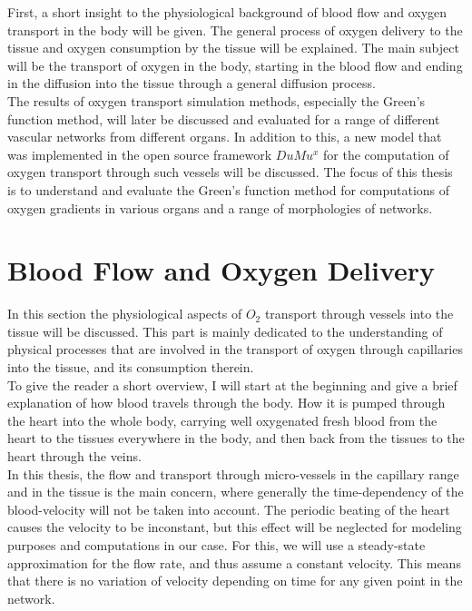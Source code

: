 First, a short insight to the physiological background of blood flow and oxygen transport in the body will be given. The general process of oxygen delivery to the tissue and oxygen consumption by the tissue will be explained. The main subject will be the transport of oxygen in the body, starting in the blood flow and ending in the diffusion into the tissue through a general diffusion process.
\\The results of oxygen transport simulation methods, especially the Green’s function method, will later be discussed and evaluated for a range of different vascular networks from different organs. In addition to this, a new model that was implemented in the open source framework $DuMu^x$ for the computation of oxygen transport through such vessels will be discussed. The focus of this thesis is to understand and evaluate the Green’s function method for computations of oxygen gradients in various organs and a range of morphologies of networks.

\newpage
\section{Blood Flow and Oxygen Delivery}

In this section the physiological aspects of $O_2$ transport through vessels into the tissue will be discussed. This part is mainly dedicated to the understanding of physical processes that are involved in the transport of oxygen through capillaries into the tissue, and its consumption therein. %
\\To give the reader a short overview, I will start at the beginning and give a brief explanation of how blood travels through the body. How it is pumped through the heart into the whole body, carrying well oxygenated fresh blood from the heart to the tissues everywhere in the body, and then back from the tissues to the heart through the veins.
\\In this thesis, the flow and transport through micro-vessels in the capillary range and in the tissue is the main concern, where generally the time-dependency of the blood-velocity will not be taken into account. The periodic beating of the heart causes the velocity to be inconstant, but this effect will be neglected for modeling purposes and computations in our case. For this, we will use a steady-state approximation for the flow rate, and thus assume a constant velocity. This means that there is no variation of velocity depending on time for any given point in the network.

